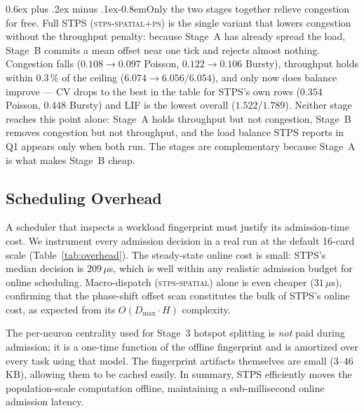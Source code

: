 \documentclass[letterpaper,twocolumn,10pt]{article}
\makeatletter
\newcommand{\tightparagraph}{\@startsection{paragraph}{4}{\z@}%
    {0.6ex plus .2ex minus .1ex}{-0.8em}{\normalfont\normalsize\bfseries}}
\makeatother
\begin{document}
\tightparagraph{Only the two stages together relieve congestion for free.} Full STPS (\textsc{stps-spatial+ps}) is the single variant that lowers congestion without the throughput penalty: because Stage~A has already spread the load, Stage~B commits a mean offset near one tick and rejects almost nothing. Congestion falls ($0.108\!\to\!0.097$ Poisson, $0.122\!\to\!0.106$ Bursty), throughput holds within $0.3$\,\% of the ceiling ($6.074\!\to\!6.056$/$6.054$), and only now does balance improve --- CV drops to the best in the table for STPS's own rows ($0.354$ Poisson, $0.448$ Bursty) and LIF is the lowest overall ($1.522$/$1.789$). Neither stage reaches this point alone: Stage~A holds throughput but not congestion, Stage~B removes congestion but not throughput, and the load balance STPS reports in Q1 appears only when both run. The stages are complementary because Stage~A is what makes Stage~B cheap.


\subsection{Scheduling Overhead}
\label{sec:eval:overhead}

A scheduler that inspects a workload fingerprint must justify its admission-time cost. We instrument every admission decision in a real run at the default 16-card scale (Table~\ref{tab:overhead}). The steady-state online cost is small: STPS's median decision is $209$\,$\mu$s, which is well within any realistic admission budget for online scheduling. Macro-dispatch (\textsc{stps-spatial}) alone is even cheaper ($31$\,$\mu$s), confirming that the phase-shift offset scan constitutes the bulk of STPS's online cost, as expected from its $O(D_{\max}\!\cdot\!H)$ complexity.

The per-neuron centrality used for Stage~3 hotspot splitting is \emph{not} paid during admission; it is a one-time function of the offline fingerprint and is amortized over every task using that model. The fingerprint artifacts themselves are small ($3$--$46$\,KB), allowing them to be cached easily. In summary, STPS efficiently moves the population-scale computation offline, maintaining a sub-millisecond online admission latency.
\end{document}
